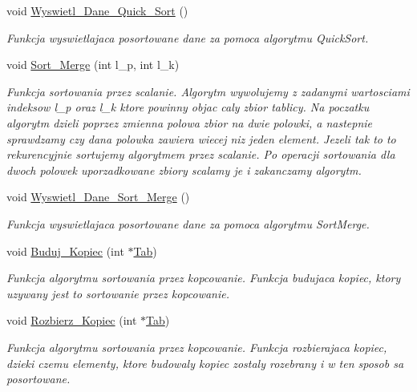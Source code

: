 \begin{DoxyCompactItemize}
void \hyperlink{class_kolejka_a482fc74f6e5e3dd4760be59130a7eec5}{\-Wyswietl\-\_\-\-Dane\-\_\-\-Quick\-\_\-\-Sort} ()
\begin{DoxyCompactList}\small\item\em \-Funkcja wyswietlajaca posortowane dane za pomoca algorytmu \-Quick\-Sort. \end{DoxyCompactList}\item 
void \hyperlink{class_kolejka_a80ab27bb35ddb60d0c0614da14e46c3a}{\-Sort\-\_\-\-Merge} (int l\-\_\-p, int l\-\_\-k)
\begin{DoxyCompactList}\small\item\em \-Funkcja sortowania przez scalanie. \-Algorytm wywolujemy z zadanymi wartosciami indeksow l\-\_\-p oraz l\-\_\-k ktore powinny objac caly zbior tablicy. \-Na poczatku algorytm dzieli poprzez zmienna polowa zbior na dwie polowki, a nastepnie sprawdzamy czy dana polowka zawiera wiecej niz jeden element. \-Jezeli tak to to rekurencyjnie sortujemy algorytmem przez scalanie. \-Po operacji sortowania dla dwoch polowek uporzadkowane zbiory scalamy je i zakanczamy algorytm. \end{DoxyCompactList}\item 
void \hyperlink{class_kolejka_ab074854cd1004b8a7c5a9413a141312e}{\-Wyswietl\-\_\-\-Dane\-\_\-\-Sort\-\_\-\-Merge} ()
\begin{DoxyCompactList}\small\item\em \-Funkcja wyswietlajaca posortowane dane za pomoca algorytmu \-Sort\-Merge. \end{DoxyCompactList}\item 
void \hyperlink{class_kolejka_a0673980c5d68690dfb10457da04f9bc0}{\-Buduj\-\_\-\-Kopiec} (int $\ast$\hyperlink{class_kolejka_adfbcda2500bf9d82a22d8d717ee6f695}{\-Tab})
\begin{DoxyCompactList}\small\item\em \-Funkcja algorytmu sortowania przez kopcowanie. \-Funkcja budujaca kopiec, ktory uzywany jest to sortowanie przez kopcowanie. \end{DoxyCompactList}\item 
void \hyperlink{class_kolejka_a933f5ada5d64f38b7d512c46f46c14b5}{\-Rozbierz\-\_\-\-Kopiec} (int $\ast$\hyperlink{class_kolejka_adfbcda2500bf9d82a22d8d717ee6f695}{\-Tab})
\begin{DoxyCompactList}\small\item\em \-Funkcja algorytmu sortowania przez kopcowanie. \-Funkcja rozbierajaca kopiec, dzieki czemu elementy, ktore budowaly kopiec zostaly rozebrany i w ten sposob sa posortowane. \end{DoxyCompactList}\item 

\end{DoxyCompactItemize}
